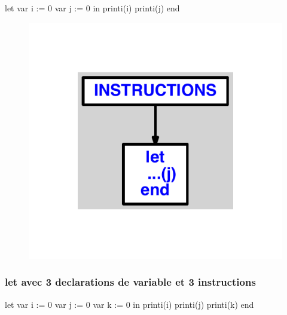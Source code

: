 \documentclass{article}
\begin{document}
\begin{verbatimtab}
let
	var i := 0
	var j := 0
in
	printi(i)
	printi(j)
end
\end{verbatimtab}
\begin{figure}[H]\centering\includegraphics[max width=\textwidth]{ast/ast_267.pdf}\end{figure}\subsubsection{let avec 3 declarations de variable et 3 instructions}
\begin{verbatimtab}
let
	var i := 0
	var j := 0
	var k := 0
in
	printi(i)
	printi(j)
	printi(k)
end
\end{verbatimtab}
\end{document}
